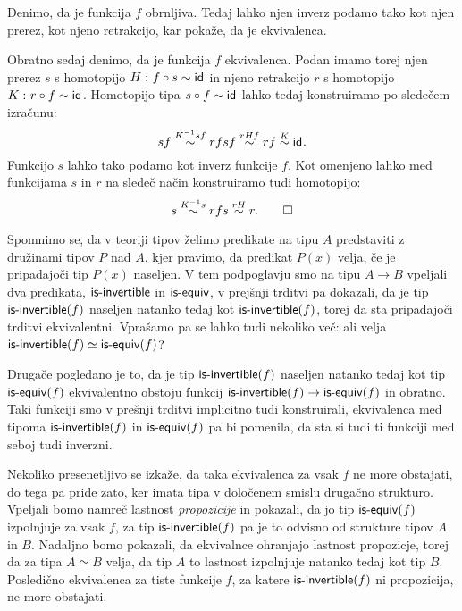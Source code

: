 \begin{dokaz}
  Denimo, da je funkcija \(f\) obrnljiva. Tedaj lahko njen inverz podamo tako kot njen
  prerez, kot njeno retrakcijo, kar pokaže, da je ekvivalenca.

  Obratno sedaj denimo, da je funkcija \(f\) ekvivalenca. Podan imamo torej njen prerez
  \(s\) s homotopijo \(H \,\colon f \circ s \sim \textnormal{\textsf{id}}_{}\) in njeno retrakcijo \(r\) s homotopijo
  \(K \,\colon r \circ f \sim \textnormal{\textsf{id}}_{}\). Homotopijo tipa \(s \circ f \sim \textnormal{\textsf{id}}_{}\) lahko tedaj konstruiramo
  po sledečem izračunu:
  \[s f \overset{K^{-1}sf}{\sim} r f s f \overset{rHf}{\sim} r f \overset{K}{\sim} \textnormal{\textsf{id}}_{}.\]
  Funkcijo \(s\) lahko tako podamo kot inverz funkcije \(f\).
  Kot omenjeno lahko med funkcijama \(s\) in \(r\) na sledeč način konstruiramo tudi homotopijo:
  \[s \overset{K^{-1}s}{\sim} rfs \overset{rH}{\sim} r. \qedhere\]
\end{dokaz}

Spomnimo se, da v teoriji tipov želimo predikate na tipu \(A\) predstaviti z družinami tipov \(P\) nad \(A\), kjer pravimo, da predikat \(P(x)\) velja, če je pripadajoči tip \(P(x)\) naseljen. V tem podpoglavju smo na tipu \(A \to B\) vpeljali dva predikata, \(\textnormal{\textsf{is-invertible}}\) in \(\textnormal{\textsf{is-equiv}}\), v prejšnji trditvi pa dokazali, da je tip \(\textnormal{\textsf{is-invertible}}(f)\) naseljen natanko tedaj kot \(\textnormal{\textsf{is-invertible}}(f)\), torej da sta pripadajoči trditvi ekvivalentni. Vprašamo pa se lahko tudi nekoliko več: ali velja \(\textnormal{\textsf{is-invertible}}(f) \simeq \textnormal{\textsf{is-equiv}}(f)\)?

Drugače pogledano je to, da je tip \(\textnormal{\textsf{is-invertible}}(f)\) naseljen natanko tedaj kot tip \(\textnormal{\textsf{is-equiv}}(f)\) ekvivalentno obstoju funkcij \(\textnormal{\textsf{is-invertible}}(f) \to \textnormal{\textsf{is-equiv}}(f)\) in obratno. Taki funkciji smo v prešnji trditvi implicitno tudi konstruirali, ekvivalenca med tipoma \(\textnormal{\textsf{is-invertible}}(f)\) in \(\textnormal{\textsf{is-equiv}}(f)\) pa bi pomenila, da sta si tudi ti funkciji med seboj tudi inverzni.

Nekoliko presenetljivo se izkaže, da taka ekvivalenca za vsak \(f\) ne more obstajati, do tega pa pride zato, ker imata tipa v določenem smislu drugačno strukturo. Vpeljali bomo namreč lastnost \emph{propozicije} in pokazali, da jo tip \(\textnormal{\textsf{is-equiv}}(f)\) izpolnjuje za vsak \(f\), za tip \(\textnormal{\textsf{is-invertible}}(f)\) pa je to odvisno od strukture tipov \(A\) in \(B\). Nadaljno bomo pokazali, da ekvivalnce ohranjajo lastnost propozicje, torej da za tipa \(A \simeq B\) velja, da tip \(A\) to lastnost izpolnjuje natanko tedaj kot tip \(B\). Posledično ekvivalenca za tiste funkcije \(f\), za katere \(\textnormal{\textsf{is-invertible}}(f)\) ni propozicija, ne more obstajati.

